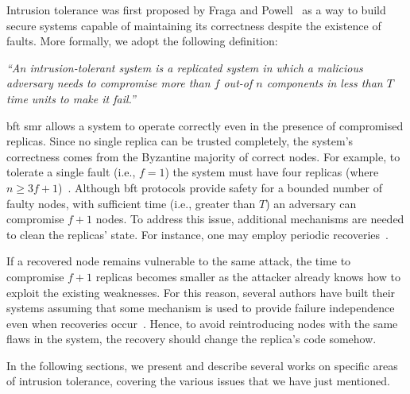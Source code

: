Intrusion tolerance was first proposed by Fraga and Powell~\cite{Fraga:1985} as a way to build secure systems capable of maintaining its correctness despite the existence of faults.
More formally, we adopt the following definition: 

\begin{defn}
\emph{``An intrusion-tolerant system is a replicated system in which a malicious adversary needs to compromise more than $f$ out-of $n$ components in less than $T$ time units to make it fail.''}~\cite{Bessani:2011}
\label{def:def2}
\end{defn}

\gls{bft} \gls{smr} allows a system to operate correctly even in the presence of compromised replicas.
Since no single replica can be trusted completely, the system's correctness comes from the Byzantine majority of correct nodes.
For example, to tolerate a single fault (i.e., $f=1$) the system must have four replicas (where $n \geq 3f+1$)~\cite{Castro:2002}.
Although \gls{bft} protocols provide safety for a bounded number of faulty nodes, with sufficient time (i.e., greater than $T$) an adversary can compromise $f+1$ nodes.
To address this issue, additional mechanisms are needed to clean the replicas' state.
For instance, one may employ periodic recoveries~\cite{Castro:2002,Sousa:2010,Roeder:2010,Platania:2014,Distler:2011}. 

If a recovered node remains vulnerable to the same attack, the time to compromise $f+1$ replicas becomes smaller as the attacker already knows how to exploit the existing weaknesses.
For this reason, several authors have built their systems assuming that some mechanism is used to provide failure independence even when recoveries occur~\cite{Castro:2002,Bessani:2008,Veronese:2013,Sousa:2010}.
Hence, to avoid reintroducing nodes with the same flaws in the system, the recovery should change the replica's code somehow.


In the following sections, we present and describe several works on specific areas of intrusion tolerance, covering the various issues that we have just mentioned.


